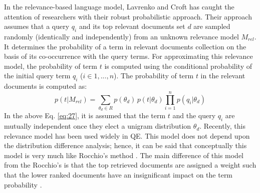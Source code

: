 In the relevance-based language model, Lavrenko and Croft \cite{lavrenko2001relevance} has caught the attention of researchers with their robust probabilistic approach. Their approach assumes that a query $q_i$ and its top relevant documents set $d$ are sampled randomly (identically and independently) from an unknown relevance model $M_{rel}$. It determines the probability of a term in relevant documents collection on the basis of its co-occurrence with the query terms.  For approximating this relevance model, the probability of term $t$ is computed using the conditional probability of the initial query term $q_i$ ($i\in 1, . . . ,n$). The probability of term $t$ in the relevant documents is computed as:
\begin{equation}\label{eq:27}
p(t|M_{rel})=\sum_{\theta_d\in R} p(\theta_d) \, p(t|\theta_d)\prod_{i=1}^{n}p(q_{i}|\theta_d)
\end{equation} 
In the above Eq. \ref{eq:27}, it is assumed that the term $t$ and the query $q_i$ are mutually independent once they elect a unigram distribution $\theta_d$. Recently, this relevance model has been used widely in QE. This model does not depend upon the distribution difference analysis; hence, it can be said that conceptually this model is very much like Rocchio's method \cite{rocchio1971relevance}. The main difference of this model from the Rocchio's is that the top retrieved documents are assigned a weight such that the lower ranked documents have an insignificant impact on the term probability \cite{lavrenko2006real}. 

